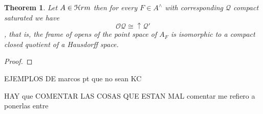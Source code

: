 \documentclass[11pt]{amsart}
\DeclareMathOperator{\pt}{pt}
\theoremstyle{plain}
\newtheorem{thm}{Theorem}[section]
\newtheorem{cor}[thm]{Corollary}
\newtheorem{prop}[thm]{Proposition}
\theoremstyle{definition}
\begin{document}









\begin{thm}\label{haus1}
Let $A\in\EuScript{H}rm$ then for every $F\in A^{\wedge}$ with corresponding $\mathcal{Q}$ compact saturated we have \[\mathcal{O}\mathcal{Q}\cong\uparrow\mathcal{Q}'\], that is,
the frame of opens of the point space of $A_{F}$ is isomorphic to a compact closed quotient of a Hausdorff space.
\end{thm}


\begin{proof}



\end{proof}

EJEMPLOS DE marcos pt que no sean KC

HAY que COMENTAR LAS COSAS QUE ESTAN MAL comentar me refiero a ponerlas entre 

	
\cite{escardo2001regular} \cite{escardo2006compactly}


\cite{sexton2006point}





\end{document}
